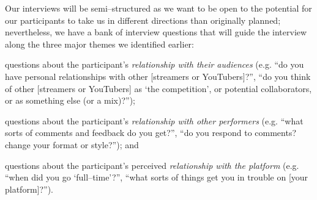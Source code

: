 \documentclass[10pt]{article}
\begin{document}
Our interviews will be semi--structured as
we want to be open to the potential for our participants to take us in different directions than originally planned;
nevertheless, we have a bank of interview questions that will
guide the interview along the three major themes we identified earlier:
\begin{inlinelist}
  \item questions about the participant's \textit{relationship with their audiences}
        (e.g. ``do you have personal relationships with other [streamers or YouTubers]?'',
              ``do you think of other [streamers or YouTubers] as `the competition', or potential collaborators, or as something else (or a mix)?'');
  \item questions about the participant's \textit{relationship with other performers}
        (e.g. ``what sorts of comments and feedback do you get?'',
              ``do you respond to comments? change your format or style?''); and
  \item questions about the participant's perceived \textit{relationship with the platform}
        (e.g. ``when did you go `full--time'?'',
              ``what sorts of things get you in trouble on [your platform]?'').
\end{inlinelist}








\pagebreak
\printbibliography{}
\end{document}
